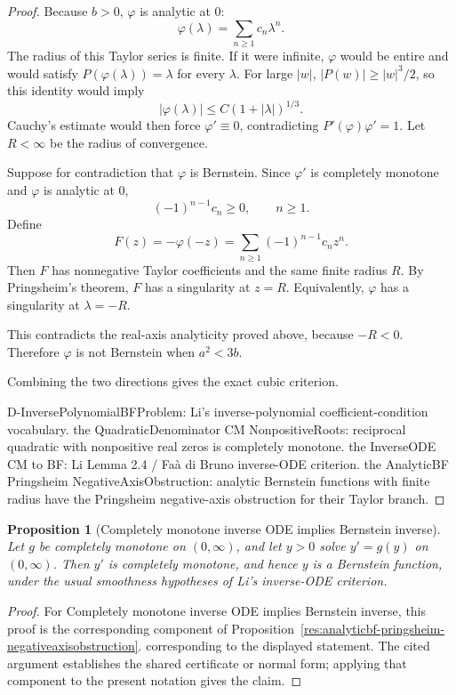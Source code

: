 \documentclass[11pt]{article}
\numberwithin{equation}{section}
\newtheorem{proposition}[theorem]{Proposition}
\theoremstyle{definition}
\theoremstyle{remark}
\newcommand{\1}{\mathbf 1}
\begin{document}
\begin{proof}
Because \(b>0\), \(\varphi\) is analytic at \(0\):
\[
\varphi(\lambda)=\sum_{n\ge1}c_n\lambda^n.
\]
The radius of this Taylor series is finite. If it were infinite, \(\varphi\) would be entire and would satisfy \(P(\varphi(\lambda))=\lambda\) for every \(\lambda\). For large \(|w|\), \(|P(w)|\ge |w|^3/2\), so this identity would imply
\[
|\varphi(\lambda)|\le C(1+|\lambda|)^{1/3}.
\]
Cauchy's estimate would then force \(\varphi'\equiv0\), contradicting \(P'(\varphi)\varphi'=1\). Let \(R<\infty\) be the radius of convergence.

Suppose for contradiction that \(\varphi\) is Bernstein. Since \(\varphi'\) is completely monotone and \(\varphi\) is analytic at \(0\),
\[
(-1)^{n-1}c_n\ge0,\qquad n\ge1.
\]
Define
\[
F(z)=-\varphi(-z)=\sum_{n\ge1}(-1)^{n-1}c_n z^n.
\]
Then \(F\) has nonnegative Taylor coefficients and the same finite radius \(R\). By Pringsheim's theorem, \(F\) has a singularity at \(z=R\). Equivalently, \(\varphi\) has a singularity at \(\lambda=-R\).

This contradicts the real-axis analyticity proved above, because \(-R<0\). Therefore \(\varphi\) is not Bernstein when \(a^2<3b\).

Combining the two directions gives the exact cubic criterion.

D-InversePolynomialBFProblem: Li's inverse-polynomial coefficient-condition vocabulary.
the QuadraticDenominator CM NonpositiveRoots: reciprocal quadratic with nonpositive real zeros is completely monotone.
the InverseODE CM to BF: Li Lemma 2.4 / Faà di Bruno inverse-ODE criterion.
the AnalyticBF Pringsheim NegativeAxisObstruction: analytic Bernstein functions with finite radius have the Pringsheim negative-axis obstruction for their Taylor branch.
\end{proof}

\begin{proposition}[Completely monotone inverse ODE implies Bernstein inverse]
\label{res:inverseode-cm-to-bf}
Let \(g\) be completely monotone on \((0,\infty)\), and let \(y>0\) solve \(y'=g(y)\) on \((0,\infty)\). Then \(y'\) is completely monotone, and hence \(y\) is a Bernstein function, under the usual smoothness hypotheses of Li's inverse-ODE criterion.
\end{proposition}

\begin{proof}
For Completely monotone inverse ODE implies Bernstein inverse, this proof is the corresponding component of Proposition~\ref{res:analyticbf-pringsheim-negativeaxisobstruction}.  corresponding to the displayed statement.  The cited argument establishes the shared certificate or normal form; applying that component to the present notation gives the claim.
\end{proof}
\end{document}
